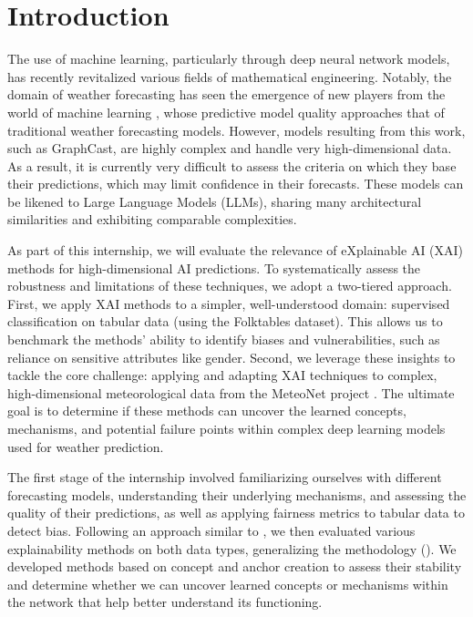 \section{Introduction}

The use of machine learning, particularly through deep neural network models, has recently revitalized various fields of mathematical engineering. Notably, the domain of weather forecasting has seen the emergence of new players from the world of machine learning \cite{graph-cast-remi} \cite{weather-forecasting-bi}, whose predictive model quality approaches that of traditional weather forecasting models. However, models resulting from this work, such as GraphCast, are highly complex and handle very high-dimensional data. As a result, it is currently very difficult to assess the criteria on which they base their predictions, which may limit confidence in their forecasts. These models can be likened to Large Language Models (LLMs), sharing many architectural similarities and exhibiting comparable complexities.  

As part of this internship, we will evaluate the relevance of eXplainable AI (XAI) methods for high-dimensional AI predictions. To systematically assess the robustness and limitations of these techniques, we adopt a two-tiered approach. First, we apply XAI methods to a simpler, well-understood domain: supervised classification on tabular data (using the Folktables dataset). This allows us to benchmark the methods' ability to identify biases and vulnerabilities, such as reliance on sensitive attributes like gender. Second, we leverage these insights to tackle the core challenge: applying and adapting XAI techniques to complex, high-dimensional meteorological data from the MeteoNet project \cite{meteo-net}. The ultimate goal is to determine if these methods can uncover the learned concepts, mechanisms, and potential failure points within complex deep learning models used for weather prediction.

The first stage of the internship involved familiarizing ourselves with different forecasting models, understanding their underlying mechanisms, and assessing the quality of their predictions, as well as applying fairness metrics to tabular data to detect bias. Following an approach similar to \cite{guide-xai-bommer}, we then evaluated various explainability methods on both data types, generalizing the methodology (\cite{guide-xai-bommer}). We developed methods based on concept and anchor creation to assess their stability and determine whether we can uncover learned concepts or mechanisms within the network that help better understand its functioning.

